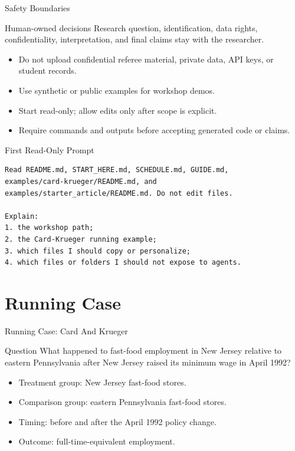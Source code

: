\begin{frame}{Safety Boundaries}
  \begin{block}{Human-owned decisions}
    Research question, identification, data rights, confidentiality,
    interpretation, and final claims stay with the researcher.
  \end{block}
  \begin{itemize}
    \item Do not upload confidential referee material, private data, API keys, or student records.
    \item Use synthetic or public examples for workshop demos.
    \item Start read-only; allow edits only after scope is explicit.
    \item Require commands and outputs before accepting generated code or claims.
  \end{itemize}
\end{frame}

\begin{frame}[fragile]{First Read-Only Prompt}
  \begin{lstlisting}[style=markdown]
Read README.md, START_HERE.md, SCHEDULE.md, GUIDE.md,
examples/card-krueger/README.md, and
examples/starter_article/README.md. Do not edit files.

Explain:
1. the workshop path;
2. the Card-Krueger running example;
3. which files I should copy or personalize;
4. which files or folders I should not expose to agents.
  \end{lstlisting}
\end{frame}

\section{Running Case}

\begin{frame}{Running Case: Card And Krueger}
  \begin{block}{Question}
    What happened to fast-food employment in New Jersey relative to eastern
    Pennsylvania after New Jersey raised its minimum wage in April 1992?
  \end{block}
  \begin{itemize}
    \item Treatment group: New Jersey fast-food stores.
    \item Comparison group: eastern Pennsylvania fast-food stores.
    \item Timing: before and after the April 1992 policy change.
    \item Outcome: full-time-equivalent employment.
  \end{itemize}
\end{frame}

